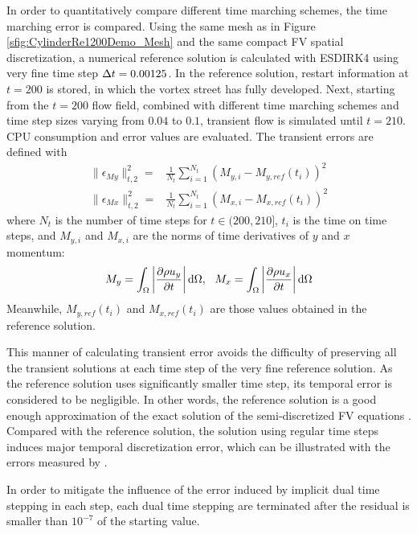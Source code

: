 In order to quantitatively compare different
time marching schemes,
the time marching error is compared.
Using the same mesh as in Figure \ref{sfig:CylinderRe1200Demo_Mesh}
and the same compact FV spatial  discretization,
a numerical reference solution is calculated with ESDIRK4 using
very fine time step ${\Delta} t = 0.00125$.
In the reference solution, restart information at $t=200$
is stored, in which the vortex street has fully developed.
Next, starting from the $t=200$ flow field, combined with
different time marching schemes and time step sizes
varying from $0.04$ to $0.1$, transient flow is simulated until $t=210$.
CPU consumption and error values are evaluated.
The transient errors are defined with
\begin{equation}
    \begin{aligned}
        \|\epsilon_{My}\|_{t,2}^2
        = & \frac{1}{N_{t}}\sum_{i=1}^{N_t}{(M_{y,i}-M_{y,ref}(t_i))^2} \\
        \|\epsilon_{Mx}\|_{t,2}^2
        = & \frac{1}{N_{t}}\sum_{i=1}^{N_t}{(M_{x,i}-M_{x,ref}(t_i))^2}
    \end{aligned}
    \label{eq:vorstreetErr}
\end{equation}
where $N_{t}$ is the number of time steps for $t\in(200,210]$,
$t_i$ is the time on time steps, and $M_{y,i}$ and $M_{x,i}$ are
the norms of time derivatives of $y$ and $x$ momentum:
\begin{equation}
    M_y = \int_{\Omega}{\left|\partialderivative{\rho u_y}{t}\right| \dd \Omega},\ \
    M_x = \int_{\Omega}{\left|\partialderivative{\rho u_x}{t}\right| \dd \Omega}
\end{equation}
Meanwhile, $M_{y,ref}(t_i)$ and $M_{x,ref}(t_i)$ are those values
obtained in the reference solution.

This manner of calculating transient error avoids the difficulty
of preserving all the transient solutions at each time step of
the very fine reference solution.
As the reference solution uses significantly smaller time step,
its temporal error is considered to be negligible.
In other words, the reference solution is a good enough
approximation of the exact solution of the semi-discretized
FV equations .
Compared with the reference
solution, the solution using regular time steps
induces major temporal discretization error, which can
be illustrated with the errors measured by .

In order to mitigate the influence of the error induced
by implicit dual time stepping in each step,
each dual time stepping are terminated after
the residual is smaller than $10^{-7}$ of the
starting value.

